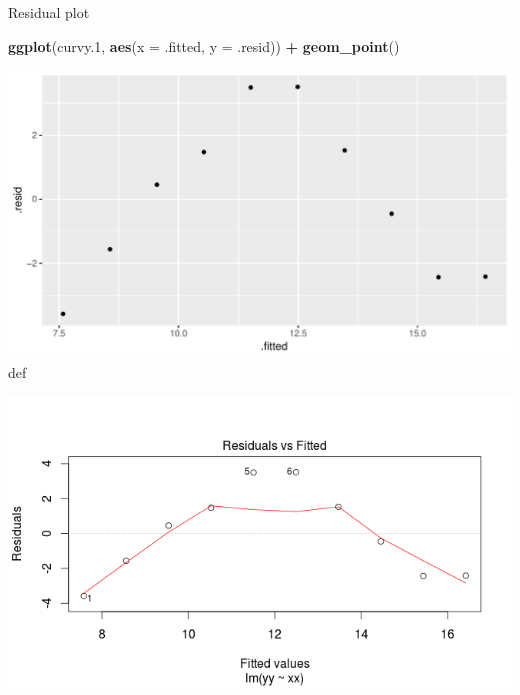 \documentclass[ignorenonframetext,]{beamer}
\newenvironment{Shaded}{\begin{snugshade}}{\end{snugshade}}
\newcommand{\DataTypeTok}[1]{\textcolor[rgb]{0.13,0.29,0.53}{#1}}
\newcommand{\FloatTok}[1]{\textcolor[rgb]{0.00,0.00,0.81}{#1}}
\newcommand{\KeywordTok}[1]{\textcolor[rgb]{0.13,0.29,0.53}{\textbf{#1}}}
\newcommand{\NormalTok}[1]{#1}
\newcommand{\OperatorTok}[1]{\textcolor[rgb]{0.81,0.36,0.00}{\textbf{#1}}}
\newcommand{\StringTok}[1]{\textcolor[rgb]{0.31,0.60,0.02}{#1}}
\begin{document}
\begin{frame}[fragile]{Residual plot}
\protect\hypertarget{residual-plot}{}

\begin{Shaded}
\begin{Highlighting}[]
\KeywordTok{ggplot}\NormalTok{(curvy}\FloatTok{.1}\NormalTok{, }\KeywordTok{aes}\NormalTok{(}\DataTypeTok{x =}\NormalTok{ .fitted, }\DataTypeTok{y =}\NormalTok{ .resid)) }\OperatorTok{+}\StringTok{ }\KeywordTok{geom_point}\NormalTok{()}
\end{Highlighting}
\end{Shaded}

\includegraphics{figure/altoadige-1.pdf} def

\includegraphics{curvy-residual.png}

\end{frame}
\end{document}
